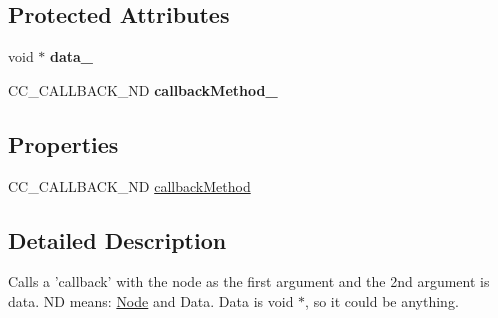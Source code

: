 \subsection*{Protected Attributes}
\begin{DoxyCompactItemize}
\item 
\hypertarget{interface_c_c_call_func_n_d_a86828a279502fd98c7aacdbd72c1863f}{void $\ast$ {\bfseries data\-\_\-}}\label{interface_c_c_call_func_n_d_a86828a279502fd98c7aacdbd72c1863f}

\item 
\hypertarget{interface_c_c_call_func_n_d_aa41ee99280e2cbaa9540b4aa823634bd}{C\-C\-\_\-\-C\-A\-L\-L\-B\-A\-C\-K\-\_\-\-N\-D {\bfseries callback\-Method\-\_\-}}\label{interface_c_c_call_func_n_d_aa41ee99280e2cbaa9540b4aa823634bd}

\end{DoxyCompactItemize}
\subsection*{Properties}
\begin{DoxyCompactItemize}
\item 
C\-C\-\_\-\-C\-A\-L\-L\-B\-A\-C\-K\-\_\-\-N\-D \hyperlink{interface_c_c_call_func_n_d_aac7c0913e85a9a4046d36e960bee2ec2}{callback\-Method}
\end{DoxyCompactItemize}


\subsection{Detailed Description}
Calls a 'callback' with the node as the first argument and the 2nd argument is data. N\-D means\-: \hyperlink{struct_node}{Node} and Data. Data is void $\ast$, so it could be anything. 

